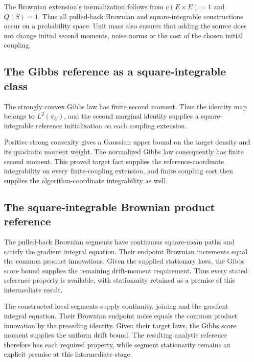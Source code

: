 \documentclass[11pt,a4paper]{article}
\begin{document}
The Brownian extension's normalization follows from \(c(E\times E)=1\) and \(Q(S)=1\). Thus all pulled-back Brownian and square-integrable constructions occur on a probability space. Unit mass also ensures that adding the source does not change initial second moments, noise norms or the cost of the chosen initial coupling.


\subsection{\texorpdfstring{The Gibbs reference as a square-integrable class}{The Gibbs reference as a square-integrable class}}


The strongly convex Gibbs law has finite second moment. Thus the identity map belongs to \(L^2(\pi_U)\), and the second marginal identity supplies a square-integrable reference initialization on each coupling extension.



Positive strong convexity gives a Gaussian upper bound on the target density and its quadratic moment weight. The normalized Gibbs law consequently has finite second moment. This proved target fact supplies the reference-coordinate integrability on every finite-coupling extension, and finite coupling cost then supplies the algorithm-coordinate integrability as well.


\subsection{\texorpdfstring{The square-integrable Brownian product reference}{The square-integrable Brownian product reference}}


The pulled-back Brownian segments have continuous square-mean paths and satisfy the gradient integral equation. Their endpoint Brownian increments equal the common product innovations. Given the supplied stationary laws, the Gibbs score bound supplies the remaining drift-moment requirement. Thus every stated reference property is available, with stationarity retained as a premise of this intermediate result.



The constructed local segments supply continuity, joining and the gradient integral equation. Their Brownian endpoint noise equals the common product innovation by the preceding identity. Given their target laws, the Gibbs score moment supplies the uniform drift bound. The resulting analytic reference therefore has each required property, while segment stationarity remains an explicit premise at this intermediate stage.
\end{document}
